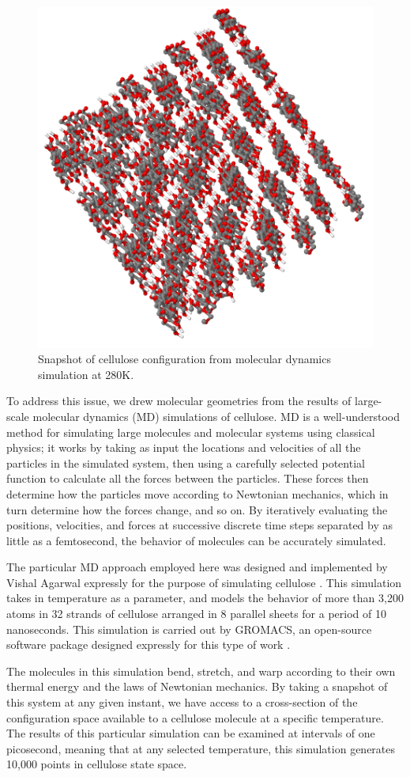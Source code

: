 \begin{figure}
	\centering
	\includegraphics[width=0.7\linewidth]{md_cellulose}
	\caption{Snapshot of cellulose configuration from molecular dynamics simulation at 280K.}
	\label{fig:md_cellulose}
\end{figure}

To address this issue, we drew molecular geometries from the results of large-scale molecular dynamics (MD) simulations of cellulose. MD is a well-understood method for simulating large molecules and molecular systems using classical physics\cite{RefWorks:25}; it works by taking as input the locations and velocities of all the particles in the simulated system, then using a carefully selected potential function to calculate all the forces between the particles. These forces then determine how the particles move according to Newtonian mechanics, which in turn determine how the forces change, and so on. By iteratively evaluating the positions, velocities, and forces at successive discrete time steps separated by as little as a femtosecond, the behavior of molecules can be accurately simulated.

The particular MD approach employed here was designed and implemented by Vishal Agarwal expressly for the purpose of simulating cellulose \cite{RefWorks:23}. This simulation takes in temperature as a parameter, and models the behavior of more than 3,200 atoms in 32 strands of cellulose arranged in 8 parallel sheets for a period of 10 nanoseconds. This simulation is carried out by GROMACS, an open-source software package designed expressly for this type of work \cite{RefWorks:24}.

The molecules in this simulation bend, stretch, and warp according to their own thermal energy and the laws of Newtonian mechanics. By taking a snapshot of this system at any given instant, we have access to a cross-section of the configuration space available to a cellulose molecule at a specific temperature. The results of this particular simulation can be examined at intervals of one picosecond, meaning that at any selected temperature, this simulation generates 10,000 points in cellulose state space.

